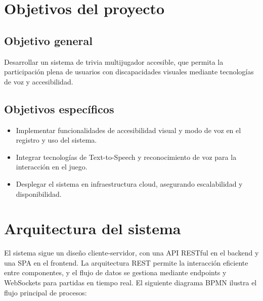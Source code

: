 \documentclass[12pt]{article}
\begin{document}
\section{Objetivos del proyecto}
\subsection{Objetivo general}
Desarrollar un sistema de trivia multijugador accesible, que permita la participación plena de usuarios con discapacidades visuales mediante tecnologías de voz y accesibilidad.

\subsection{Objetivos específicos}
\begin{itemize}
    \item Implementar funcionalidades de accesibilidad visual y modo de voz en el registro y uso del sistema.
    \item Integrar tecnologías de Text-to-Speech y reconocimiento de voz para la interacción en el juego.
    \item Desplegar el sistema en infraestructura cloud, asegurando escalabilidad y disponibilidad.
\end{itemize}

\section{Arquitectura del sistema}
El sistema sigue un diseño cliente-servidor, con una API RESTful en el backend y una SPA en el frontend. La arquitectura REST permite la interacción eficiente entre componentes, y el flujo de datos se gestiona mediante endpoints y WebSockets para partidas en tiempo real. El siguiente diagrama BPMN ilustra el flujo principal de procesos:
\end{document}
